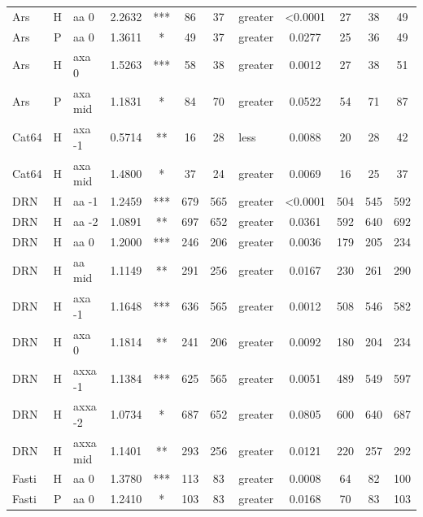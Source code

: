 \documentclass[twocolumn, switch]{article} %
\begin{document}
\begin{table}[h!]
\begin{adjustbox}{totalheight=0.9\textheight}
\begin{tabular}{lclcccclcc@{\hspace{1\tabcolsep}}c@{\hspace{1\tabcolsep}}c}
           Ars &     H &      aa 0 & 2.2632 &   *** &    86 &        37 &     greater & <0.0001 &    27 &    38 &    49 \\
           Ars &     P &      aa 0 & 1.3611 &     * &    49 &        37 &     greater & 0.0277 &    25 &    36 &    49 \\
           Ars &     H &     axa 0 & 1.5263 &   *** &    58 &        38 &     greater & 0.0012 &    27 &    38 &    51 \\
           Ars &     P &   axa mid & 1.1831 &     * &    84 &        70 &     greater & 0.0522 &    54 &    71 &    87 \\
         Cat64 &     H &    axa -1 & 0.5714 &    ** &    16 &        28 &        less & 0.0088 &    20 &    28 &    42 \\
         Cat64 &     H &   axa mid & 1.4800 &     * &    37 &        24 &     greater & 0.0069 &    16 &    25 &    37 \\
           DRN &     H &     aa -1 & 1.2459 &   *** &   679 &       565 &     greater & <0.0001 &   504 &   545 &   592 \\
           DRN &     H &     aa -2 & 1.0891 &    ** &   697 &       652 &     greater & 0.0361 &   592 &   640 &   692 \\
           DRN &     H &      aa 0 & 1.2000 &   *** &   246 &       206 &     greater & 0.0036 &   179 &   205 &   234 \\
           DRN &     H &    aa mid & 1.1149 &    ** &   291 &       256 &     greater & 0.0167 &   230 &   261 &   290 \\
           DRN &     H &    axa -1 & 1.1648 &   *** &   636 &       565 &     greater & 0.0012 &   508 &   546 &   582 \\
           DRN &     H &     axa 0 & 1.1814 &    ** &   241 &       206 &     greater & 0.0092 &   180 &   204 &   234 \\
           DRN &     H &   axxa -1 & 1.1384 &   *** &   625 &       565 &     greater & 0.0051 &   489 &   549 &   597 \\
           DRN &     H &   axxa -2 & 1.0734 &     * &   687 &       652 &     greater & 0.0805 &   600 &   640 &   687 \\
           DRN &     H &  axxa mid & 1.1401 &    ** &   293 &       256 &     greater & 0.0121 &   220 &   257 &   292 \\
         Fasti &     H &      aa 0 & 1.3780 &   *** &   113 &        83 &     greater & 0.0008 &    64 &    82 &   100 \\
         Fasti &     P &      aa 0 & 1.2410 &     * &   103 &        83 &     greater & 0.0168 &    70 &    83 &   103 \\

\end{tabular}
\end{adjustbox}
\end{table}
\end{document}
